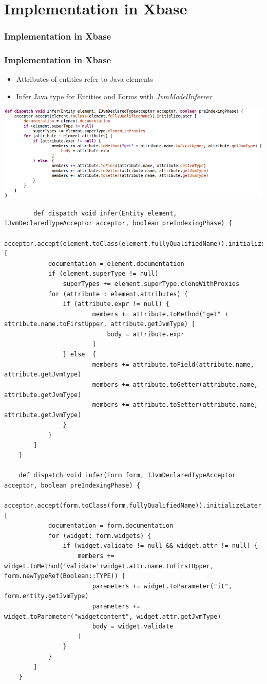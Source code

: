 \section[Xbase]{Implementation in Xbase}

\begin{frame}
  \frametitle{Implementation in Xbase}
  \tableofcontents[currentsection]
\end{frame}
  
\begin{frame}
  \frametitle{Implementation in Xbase}
  \begin{itemize}
    \item Attributes of entities refer to Java elements
    \item Infer Java type for Entities and Forms with
    \emph{JvmModelInferrer}
  \end{itemize}
  
  \includegraphics[width=\linewidth]{img/xbase-infer.png}  
 
  \begin{verbatim}
    	def dispatch void infer(Entity element, IJvmDeclaredTypeAcceptor acceptor, boolean preIndexingPhase) {
   		acceptor.accept(element.toClass(element.fullyQualifiedName)).initializeLater [
			documentation = element.documentation
			if (element.superType != null)
				superTypes += element.superType.cloneWithProxies
		    for (attribute : element.attributes) {
		    	if (attribute.expr != null) {
						members += attribute.toMethod("get" + attribute.name.toFirstUpper, attribute.getJvmType) [
			        		body = attribute.expr
		        		]
		        } else  {
		            	members += attribute.toField(attribute.name, attribute.getJvmType)
			            members += attribute.toGetter(attribute.name, attribute.getJvmType)
			            members += attribute.toSetter(attribute.name, attribute.getJvmType)
		        }
		    }
   		]
   	}

 	def dispatch void infer(Form form, IJvmDeclaredTypeAcceptor acceptor, boolean preIndexingPhase) {
   		acceptor.accept(form.toClass(form.fullyQualifiedName)).initializeLater [
			documentation = form.documentation
		    for (widget: form.widgets) {
		    	if (widget.validate != null && widget.attr != null) {
		    		members += widget.toMethod('validate'+widget.attr.name.toFirstUpper, form.newTypeRef(Boolean::TYPE)) [
		    			parameters += widget.toParameter("it", form.entity.getJvmType)
		    			parameters += widget.toParameter("widgetcontent", widget.attr.getJvmType)
		    			body = widget.validate
		    		]
		    	}
		    }   		 	
   		]
   	}
  \end{verbatim}
  
\end{frame}